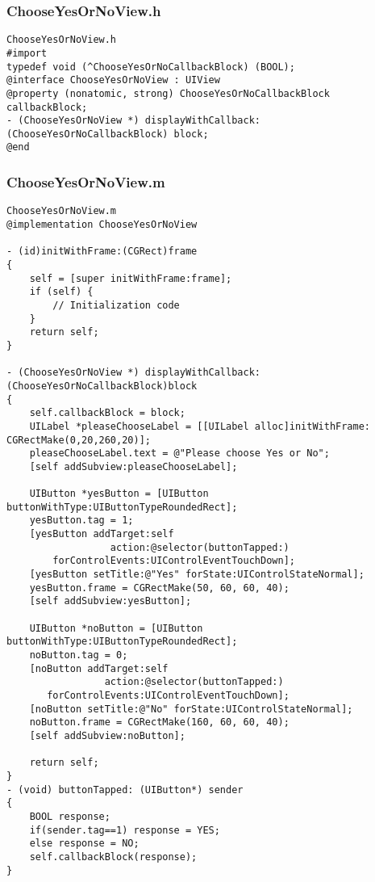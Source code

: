\documentclass[12pt]{article}
\begin{document}
\subsubsection{ChooseYesOrNoView.h}
\begin{lstlisting}
ChooseYesOrNoView.h
#import 
typedef void (^ChooseYesOrNoCallbackBlock) (BOOL);
@interface ChooseYesOrNoView : UIView
@property (nonatomic, strong) ChooseYesOrNoCallbackBlock callbackBlock;
- (ChooseYesOrNoView *) displayWithCallback:(ChooseYesOrNoCallbackBlock) block;
@end
\end{lstlisting}

\subsubsection{ChooseYesOrNoView.m}
\begin{lstlisting}
ChooseYesOrNoView.m
@implementation ChooseYesOrNoView

- (id)initWithFrame:(CGRect)frame
{
    self = [super initWithFrame:frame];
    if (self) {
        // Initialization code
    }
    return self;
}

- (ChooseYesOrNoView *) displayWithCallback:(ChooseYesOrNoCallbackBlock)block
{
    self.callbackBlock = block;
    UILabel *pleaseChooseLabel = [[UILabel alloc]initWithFrame: CGRectMake(0,20,260,20)];
    pleaseChooseLabel.text = @"Please choose Yes or No";
    [self addSubview:pleaseChooseLabel];
    
    UIButton *yesButton = [UIButton buttonWithType:UIButtonTypeRoundedRect];
    yesButton.tag = 1;
    [yesButton addTarget:self
                  action:@selector(buttonTapped:)
        forControlEvents:UIControlEventTouchDown];
    [yesButton setTitle:@"Yes" forState:UIControlStateNormal];
    yesButton.frame = CGRectMake(50, 60, 60, 40);
    [self addSubview:yesButton];
    
    UIButton *noButton = [UIButton buttonWithType:UIButtonTypeRoundedRect];
    noButton.tag = 0;
    [noButton addTarget:self
                 action:@selector(buttonTapped:)
       forControlEvents:UIControlEventTouchDown];
    [noButton setTitle:@"No" forState:UIControlStateNormal];
    noButton.frame = CGRectMake(160, 60, 60, 40);
    [self addSubview:noButton];
    
    return self;
}
- (void) buttonTapped: (UIButton*) sender
{
    BOOL response;
    if(sender.tag==1) response = YES;
    else response = NO;
    self.callbackBlock(response);
}

\end{lstlisting}
\end{document}
